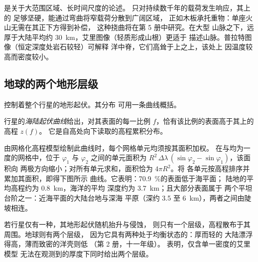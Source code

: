 是关于大范围区域、长时间尺度的论述。
只对持续数千年的载荷发生响应，其上的
足够坚硬，能通过弯曲将窄载荷分散到广阔区域，
正如木板承托重物：单座火山无需在其正下方得到补偿，
这种挠曲将在第 5 册中研究。在大型
山脉之下，远厚于大陆平均约
\qty{30}{km}，艾里图像（轻质形成山根）更适于
描述山脉。普拉特图像（恒定深度处岩石较轻）可解释
洋中脊，它们高耸于上之上，该处上
因温度较高而密度较小。

\subsection*{地球的两个地形层级}

控制着整个行星的地形起伏。其分布
可用一条曲线概括。

\begin{definition}[海陆起伏曲线]\label{def:b1:isostasy-gravity:hypsometry}
行星的\emph{海陆起伏曲线}给出，对其表面的每一比例
$f$，恰有该比例的表面高于其上的高程 $z(f)$。
它是自高处向下读取的高程累积分布。
\end{definition}

由网格化高程模型绘制此曲线时，每个网格单元均须按其面积加权。
在与均为一度的网格中，位于
$\varphi_1$ 与 $\varphi_2$ 之间的单元面积为
$R^2\,\Delta\lambda\,(\sin\varphi_2 - \sin\varphi_1)$，该面积向
两极方向缩小；对所有单元求和，面积恰为 $4\pi R^2$。将
各单元按高程排序并累加其面积，即得下图所示
曲线。它表明：\qty{70.9}{\percent}的表面低于海平面；
陆地的平均高程约为 \qty{0.8}{km}，海洋的平均
深度约为 \qty{3.7}{km}；且大部分表面属于
两个平坦台阶之一：近海平面的大陆台地与深海
平原（深约 3.5 至 \qty{6}{km}），两者之间由陡坡相连。

若行星仅有一种，其地形起伏随机抬升与侵蚀，
则只有一个层级，高程散布于其周围。地球则有两个层级，
因为它具有两种处于均衡状态的：厚而轻的
大陆漂浮得高，薄而致密的洋壳则低
（第 2 册，十一年级）。 表明，仅含单一密度的艾里模型
无法在观测到的厚度下同时给出两个层级。


